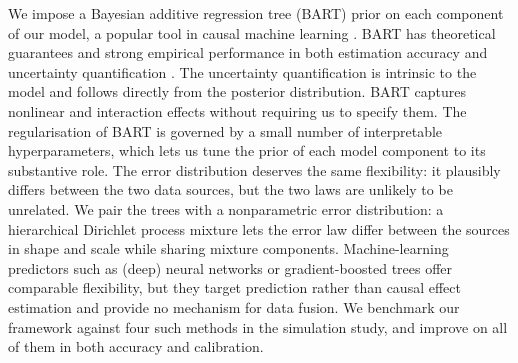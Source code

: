 We impose a Bayesian additive regression tree (BART) prior \citep{chipman2010bart} on each component of our model, a popular tool in causal machine learning \citep{hill2011bayesian}.
BART has theoretical guarantees \citep{rockova2020posterior} and strong empirical performance in both estimation accuracy and uncertainty quantification \citep{dorie2019, thal2023, kabata2026}.
The uncertainty quantification is intrinsic to the model and follows directly from the posterior distribution.
BART captures nonlinear and interaction effects without requiring us to specify them.
The regularisation of BART is governed by a small number of interpretable hyperparameters, which lets us tune the prior of each model component to its substantive role.
The error distribution deserves the same flexibility: it plausibly differs between the two data sources, but the two laws are unlikely to be unrelated.
We pair the trees with a nonparametric error distribution: a hierarchical Dirichlet process mixture lets the error law differ between the sources in shape and scale while sharing mixture components.
Machine-learning predictors such as (deep) neural networks or gradient-boosted trees offer comparable flexibility, but they target prediction rather than causal effect estimation and provide no mechanism for data fusion.
We benchmark our framework against four such methods in the simulation study, and improve on all of them in both accuracy and calibration.